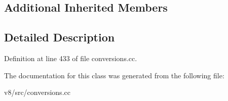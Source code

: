 \subsection*{Additional Inherited Members}


\subsection{Detailed Description}


Definition at line 433 of file conversions.\+cc.



The documentation for this class was generated from the following file\+:\begin{DoxyCompactItemize}
\item 
v8/src/conversions.\+cc\end{DoxyCompactItemize}
